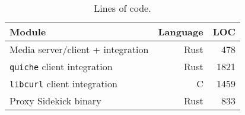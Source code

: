 \begin{table}[ht]
  \centering
  \begin{tabular}{l r r}
    \hline
    \textbf{Module} & \textbf{Language} & \textbf{LOC} \\
    \hline
    Media server/client + integration & Rust & 478 \\
    \texttt{quiche} client integration & Rust & 1821 \\
    \texttt{libcurl} client integration & C & 1459 \\
    Proxy Sidekick binary & Rust & 833 \\
    \hline
  \end{tabular}
  \caption{Lines of code.
  }
  \label{tab:sidekick:lines-of-code}
\end{table}
